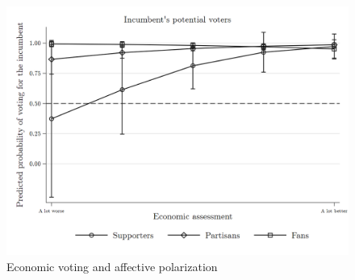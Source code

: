 \documentclass[a4paper, svgnames]{article}
\begin{document}
\begin{figure}[H]
	\centering
	\includegraphics[scale=0.35]{Figures/dummy_oppo_incumb2.png}
	\caption{\label{fig:margins} Economic voting and affective polarization}
\end{figure}


\end{document}
